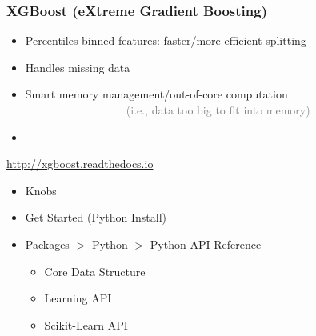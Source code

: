 \documentclass[xcolor={dvipsnames}]{beamer}
\begin{document}
\frame
{
 \frametitle{XGBoost (eXtreme Gradient Boosting)}

\begin{itemize}
\item Percentiles binned features: faster/more efficient splitting 
\item Handles missing data
\item Smart memory management/out-of-core computation\\
$\quad\quad\quad\quad\quad\quad\quad\quad\quad$\textcolor{gray}{(i.e., data too big to fit into memory)}
\item[] 
\end{itemize}

\url{http://xgboost.readthedocs.io}
\begin{itemize}
\item Knobs
\item Get Started (Python Install)
\item Packages $>$ Python $>$ Python API Reference
\begin{itemize}
\item Core Data Structure
\item Learning API
\item Scikit-Learn API
\end{itemize}
\end{itemize}

}
\end{document}
